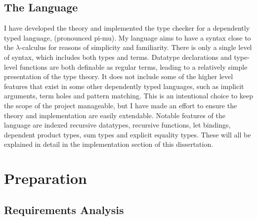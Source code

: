 \documentclass[12pt,a4paper,twoside]{report}
\begin{document}
\section{The \pimu{} Language}

I have developed the theory and implemented the type checker for a dependently typed language, \pimu{} (pronounced pi-mu).
My language aims to have a syntax close to the \(\lambda\)-calculus for reasons of simplicity and familiarity.
There is only a single level of syntax, which includes both types and terms.
Datatype declarations and type-level functions are both definable as regular terms, leading to a relatively simple presentation of the type theory.
It does not include some of the higher level features that exist in some other dependently typed languages, such as implicit arguments, term holes and pattern matching.
This is an intentional choice to keep the scope of the project manageable, but I have made an effort to ensure the theory and implementation are easily extendable.
Notable features of the language are indexed recursive datatypes, recursive functions, let bindings, dependent product types, sum types and explicit equality types.
These will all be explained in detail in the implementation section of this dissertation.

\chapter{Preparation}

\section{Requirements Analysis}
\end{document}
